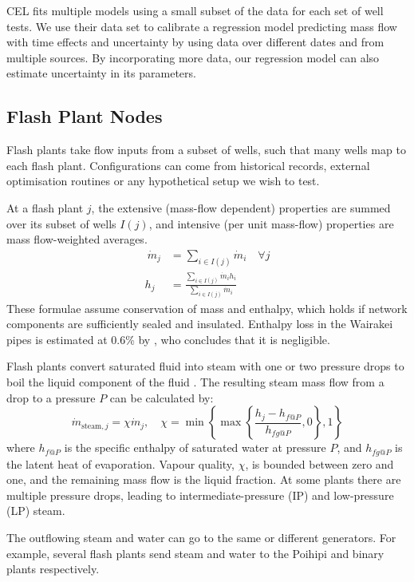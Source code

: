 \documentclass[a4paper, 12pt]{article}
\newlength{\drop}
\begin{document}
CEL fits multiple models using a small subset of the data for each set of well tests. We use their data set to calibrate a regression model predicting mass flow with time effects and uncertainty by using data over different dates and from multiple sources. By incorporating more data, our regression model can also estimate uncertainty in its parameters.

\subsection{Flash Plant Nodes}
Flash plants take flow inputs from a subset of wells, such that many wells map to each flash plant. Configurations can come from historical records, external optimisation routines or any hypothetical setup we wish to test.

At a flash plant $j$, the extensive (mass-flow dependent) properties are summed over its subset of wells $I(j)$, and intensive (per unit mass-flow) properties are mass flow-weighted averages.
\begin{align} \
\dot{m}_j &= \sum_{i\in I(j)} \dot{m}_i\quad \forall j \label{eq:fp_mf} \\
h_j &= \frac{\sum_{i\in I(j)} \dot{m}_i h_i}{\sum_{i\in I(j)} \dot{m}_i} \label{eq:fp_h}
\end{align}
These formulae assume conservation of mass and enthalpy, which holds if network components are sufficiently sealed and insulated. Enthalpy loss in the Wairakei pipes is estimated at 0.6\% by \citet{Zarrouk:2014}, who concludes that it is negligible.

Flash plants convert saturated fluid into steam with one or two pressure drops to boil the liquid component of the fluid \citep{Grant:2011}. The resulting steam mass flow from a drop to a pressure $P$ can be calculated by:
\begin{equation}
\dot{m}_{\text{steam},j} = \chi\dot{m}_j,\quad \chi= \min{\left\{\max{\left\{\frac{h_j - h_{f@P}}{h_{fg@P}}, 0\right\}}, 1\right\}}
\end{equation}
where $h_{f@P}$ is the specific enthalpy of saturated water at pressure $P$, and $h_{fg@P}$ is the latent heat of evaporation. Vapour quality, $\chi$, is bounded between zero and one, and the remaining mass flow is the liquid fraction. At some plants there are multiple pressure drops, leading to intermediate-pressure (IP) and low-pressure (LP) steam.

The outflowing steam and water can go to the same or different generators. For example, several flash plants send steam and water to the Poihipi and binary plants respectively.
\end{document}
